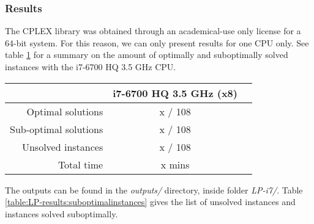 \subsubsection{Results}
\label{sec:benchmarking:linear-programming:results}

The CPLEX library was obtained through an academical-use only license for a 64-bit system.
For this reason, we can only present results for one CPU only. See table \ref{table:LP-results}
for a summary on the amount of optimally and suboptimally solved instances with the i7-6700 HQ 3.5 GHz
CPU.

\begin{table}[H]
\centering
	\begin{tabular}{rcc}
								& i7-6700 HQ 3.5 GHz (x8) \\
		\midrule
		Optimal solutions		& x / 108 \\
		Sub-optimal solutions	& x / 108 \\
		Unsolved instances		& x / 108 \\
		Total time				& x mins \\
	\end{tabular}
	\label{table:LP-results}
\end{table}

The outputs can be found in the \textit{outputs/} directory, inside folder
\textit{LP-i7/}. Table \ref{table:LP-results:suboptimalinstances}
gives the list of unsolved instances and instances solved suboptimally.

